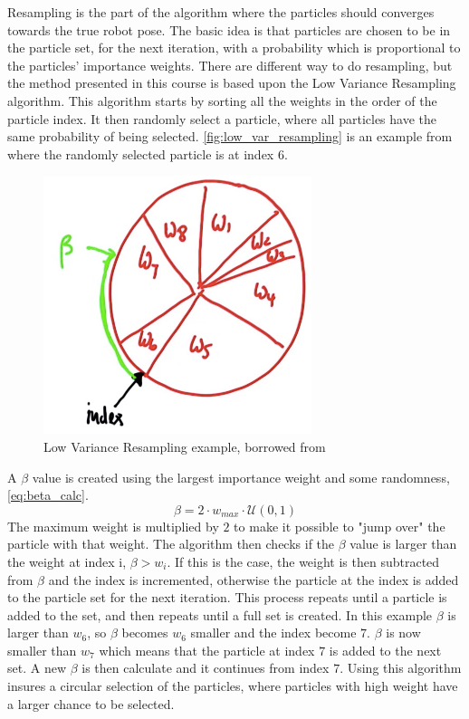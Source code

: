 \documentclass[Main]{subfiles}
\begin{document}
Resampling is the part of the algorithm where the particles should converges towards the true robot pose.
The basic idea is that particles are chosen to be in the particle set, for the next iteration, with a probability which is proportional to the particles' importance weights.
There are different way to do resampling, but the method presented in this course is based upon the Low Variance Resampling algorithm.
This algorithm starts by sorting all the weights in the order of the particle index.
It then randomly select a particle, where all particles have the same probability of being selected.
\autoref{fig:low_var_resampling} is an example from \citep{Thrun2002} where the randomly selected particle is at index 6.
\begin{figure}[H]
	\centering
	\includegraphics[width=0.3\linewidth]{./Figures/low_var_resampling.png}
	\caption{Low Variance Resampling example, borrowed from \citep{Thrun2015}}
	\label{fig:low_var_resampling}
\end{figure}\noindent
A $\beta$ value is created using the largest importance weight and some randomness, \autoref{eq:beta_calc}.
\begin{equation}
\label{eq:beta_calc}
	\beta = 2 \cdot w_{max} \cdot \mathcal{U}(0,1)
\end{equation}
The maximum weight is multiplied by $2$ to make it possible to "jump over" the particle with that weight.
The algorithm then checks if the $\beta$ value is larger than the weight at index i, $\beta > w_i$.
If this is the case, the weight is then subtracted from $\beta$ and the index is incremented, otherwise the particle at the index is added to the particle set for the next iteration. 
This process repeats until a particle is added to the set, and then repeats until a full set is created.
In this example $\beta$ is larger than $w_6$, so $\beta$ becomes $w_6$ smaller and the index become $7$.
$\beta$ is now smaller than $w_7$ which means that the particle at index $7$ is added to the next set. 
A new $\beta$ is then calculate and it continues from index $7$.
Using this algorithm insures a circular selection of the particles, where particles with high weight have a larger chance to be selected.
\end{document}

